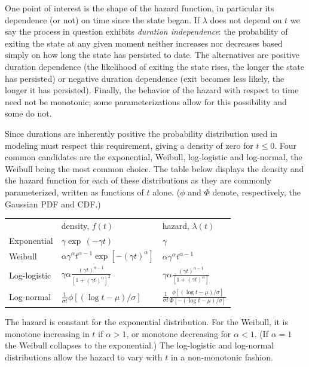 One point of interest is the shape of the hazard function, in
particular its dependence (or not) on time since the state began.  If
$\lambda$ does not depend on $t$ we say the process in question exhibits
\emph{duration independence}: the probability of exiting the state at
any given moment neither increases nor decreases based simply on how
long the state has persisted to date. The alternatives are positive
duration dependence (the likelihood of exiting the state rises, the
longer the state has persisted) or negative duration dependence (exit
becomes less likely, the longer it has persisted).  Finally, the
behavior of the hazard with respect to time need not be monotonic;
some parameterizations allow for this possibility and some do not.

Since durations are inherently positive the probability distribution
used in modeling must respect this requirement, giving a density of
zero for $t \leq 0$.  Four common candidates are the exponential,
Weibull, log-logistic and log-normal, the Weibull being the most
common choice. The table below displays the density and the hazard
function for each of these distributions as they are commonly
parameterized, written as functions of $t$ alone. ($\phi$ and $\Phi$
denote, respectively, the Gaussian PDF and CDF.)

\begin{center}
\setlength\tabcolsep{1.5em}
\begin{tabular}{lll}
 & density, $f(t)$ & hazard, $\lambda(t)$ \\ [1ex]
Exponential & $\displaystyle 
\gamma \exp\,(-\gamma t)$ &$\displaystyle
\gamma$ \\ [1ex]
Weibull & $\displaystyle
\alpha\gamma^{\alpha}t^{\alpha-1}\exp\left[-(\gamma t)^\alpha\right]$ 
& $\displaystyle \alpha\gamma^{\alpha}t^{\alpha-1}$ \\ [1ex]
Log-logistic & $\displaystyle \gamma\alpha
\frac{(\gamma t)^{\alpha-1}}
{\left[1 + (\gamma t)^\alpha\right]^2}$ 
& $\displaystyle \gamma\alpha
\frac{(\gamma t)^{\alpha-1}}
{\left[1 + (\gamma t)^\alpha\right]}$ \\ [2.5ex]
Log-normal & $\displaystyle
\frac{1}{\sigma t} \phi\left[(\log t - \mu)/\sigma \right]$ 
& $\displaystyle
\frac{1}{\sigma t} \frac{\phi\left[(\log t - \mu)/\sigma \right]}
{\Phi\left[-(\log t - \mu)/\sigma \right]}$
\end{tabular}
\end{center}

The hazard is constant for the exponential distribution.  For the
Weibull, it is monotone increasing in $t$ if $\alpha > 1$, or
monotone decreasing for $\alpha < 1$. (If $\alpha = 1$ the Weibull
collapses to the exponential.)  The log-logistic and log-normal
distributions allow the hazard to vary with $t$ in a non-monotonic
fashion.

